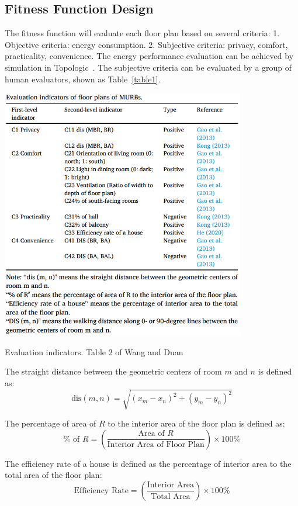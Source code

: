 \documentclass[]{article}
\begin{document}
\subsection{Fitness Function Design}
The fitness function will evaluate each floor plan based on several criteria:
1. Objective criteria: energy consumption.
2. Subjective criteria: privacy, comfort, practicality, convenience.
The energy performance evaluation can be achieved by simulation in Topologic~\cite{WANG2023100238}. The subjective criteria can be evaluated by a group of human evaluators, shown as Table~\ref{table1}.
\begin{table}[h]
  \centering
  \includegraphics[width=0.8\textwidth]{image1.png}
  \caption{Evaluation indicators. Table 2 of Wang and Duan\cite{WANG2023100238}}\label{table1}
\end{table}

The straight distance between the geometric centers of room $m$ and $n$ is defined as:
\begin{equation*}
\text{dis}(m, n) = \sqrt{(x_m - x_n)^2 + (y_m - y_n)^2}
\end{equation*}

The percentage of area of $R$ to the interior area of the floor plan is defined as:
\begin{equation*}
\% \text{ of } R = \left( \frac{\text{Area of } R}{\text{Interior Area of Floor Plan}} \right) \times 100\%
\end{equation*}

The efficiency rate of a house is defined as the percentage of interior area to the total area of the floor plan:
\begin{equation*}
\text{Efficiency Rate} = \left( \frac{\text{Interior Area}}{\text{Total Area}} \right) \times 100\%
\end{equation*}
\end{document}
